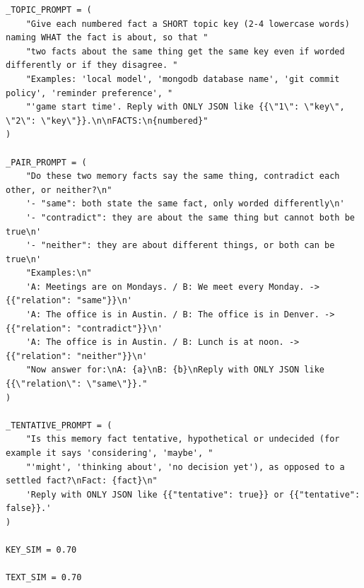 \documentclass[11pt]{article}
\begin{document}
\begingroup\lstset{basicstyle=\ttfamily\scriptsize}
\begin{lstlisting}
_TOPIC_PROMPT = (
    "Give each numbered fact a SHORT topic key (2-4 lowercase words) naming WHAT the fact is about, so that "
    "two facts about the same thing get the same key even if worded differently or if they disagree. "
    "Examples: 'local model', 'mongodb database name', 'git commit policy', 'reminder preference', "
    "'game start time'. Reply with ONLY JSON like {{\"1\": \"key\", \"2\": \"key\"}}.\n\nFACTS:\n{numbered}"
)

_PAIR_PROMPT = (
    "Do these two memory facts say the same thing, contradict each other, or neither?\n"
    '- "same": both state the same fact, only worded differently\n'
    '- "contradict": they are about the same thing but cannot both be true\n'
    '- "neither": they are about different things, or both can be true\n'
    "Examples:\n"
    'A: Meetings are on Mondays. / B: We meet every Monday. -> {{"relation": "same"}}\n'
    'A: The office is in Austin. / B: The office is in Denver. -> {{"relation": "contradict"}}\n'
    'A: The office is in Austin. / B: Lunch is at noon. -> {{"relation": "neither"}}\n'
    "Now answer for:\nA: {a}\nB: {b}\nReply with ONLY JSON like {{\"relation\": \"same\"}}."
)

_TENTATIVE_PROMPT = (
    "Is this memory fact tentative, hypothetical or undecided (for example it says 'considering', 'maybe', "
    "'might', 'thinking about', 'no decision yet'), as opposed to a settled fact?\nFact: {fact}\n"
    'Reply with ONLY JSON like {{"tentative": true}} or {{"tentative": false}}.'
)

KEY_SIM = 0.70

TEXT_SIM = 0.70
\end{lstlisting}
\endgroup
\begingroup\lstset{basicstyle=\ttfamily\scriptsize}
\end{document}

